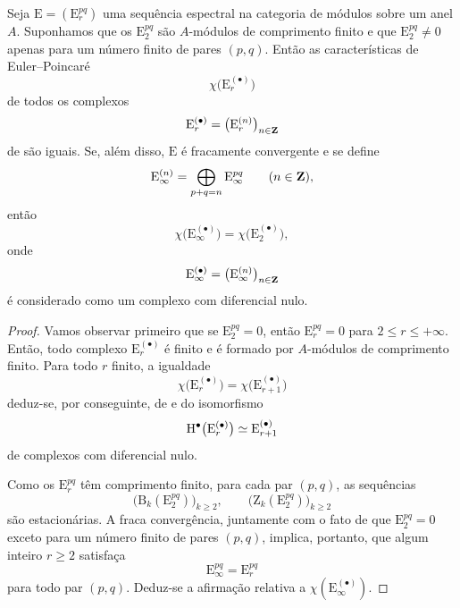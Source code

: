 \begin{corollary}[11.10.3]
\label{0.11.10.3}
Seja $\mathrm{E}=(\mathrm{E}_r^{pq})$ uma sequência espectral na
categoria de módulos sobre um anel $A$.
Suponhamos que os $\mathrm{E}_2^{pq}$ são $A$-módulos de comprimento finito e
que $\mathrm{E}_2^{pq}\neq0$ apenas para um número finito de pares $(p,q)$.
Então as características de Euler--Poincar\'e
\[
  \chi\bigl(\mathrm{E}_r^{(\bullet)}\bigr)
\]
de todos os complexos
\[
  \mathrm{E}_r^{(\bullet)}
  =
  \bigl(\mathrm{E}_r^{(n)}\bigr)_{n\in\mathbf{Z}}
\]
de  são iguais.
Se, além disso, $\mathrm{E}$ é fracamente convergente e se define
\[
  \mathrm{E}_\infty^{(n)}
  =
  \bigoplus_{p+q=n}\mathrm{E}_\infty^{pq}
  \qquad(n\in\mathbf{Z}),
\]
então
\[
  \chi\bigl(\mathrm{E}_\infty^{(\bullet)}\bigr)
  =
  \chi\bigl(\mathrm{E}_2^{(\bullet)}\bigr),
\]
onde
\[
  \mathrm{E}_\infty^{(\bullet)}
  =
  \bigl(\mathrm{E}_\infty^{(n)}\bigr)_{n\in\mathbf{Z}}
\]
é considerado como um complexo com diferencial nulo.
\end{corollary}

\begin{proof}
Vamos observar primeiro que se $\mathrm{E}_2^{pq}=0$, então
$\mathrm{E}_r^{pq}=0$ para $2\leq r\leq+\infty$.
Então, todo complexo $\mathrm{E}_r^{(\bullet)}$ é finito e é formado por
$A$-módulos de comprimento finito.
Para todo $r$ finito, a igualdade
\[
  \chi\bigl(\mathrm{E}_r^{(\bullet)}\bigr)
  =
  \chi\bigl(\mathrm{E}_{r+1}^{(\bullet)}\bigr)
\]
deduz-se, por conseguinte, de  e do isomorfismo
\[
  \mathrm{H}^\bullet\bigl(\mathrm{E}_r^{(\bullet)}\bigr)
  \simeq
  \mathrm{E}_{r+1}^{(\bullet)}
\]
de complexos com diferencial nulo.

Como os $\mathrm{E}_r^{pq}$ têm comprimento finito, para cada par
$(p,q)$, as sequências
\[
  \bigl(\mathrm{B}_k(\mathrm{E}_2^{pq})\bigr)_{k\geq2},
  \qquad
  \bigl(\mathrm{Z}_k(\mathrm{E}_2^{pq})\bigr)_{k\geq2}
\]
são estacionárias.
A fraca convergência, juntamente com o fato de que
$\mathrm{E}_2^{pq}=0$ exceto para um número finito de pares $(p,q)$, implica, portanto,
que algum inteiro $r\geq2$ satisfaça
\[
  \mathrm{E}_\infty^{pq}=\mathrm{E}_r^{pq}
\]
para todo par $(p,q)$.
Deduz-se a afirmação relativa a
$\chi(\mathrm{E}_\infty^{(\bullet)})$.
\end{proof}
